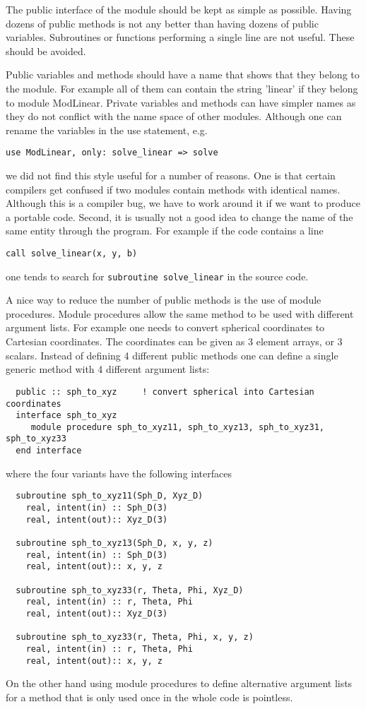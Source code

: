 \documentclass{article}
\begin{document}
The public interface of the module should be kept as simple as possible. Having
dozens of public methods is not any better than having dozens of public 
variables. Subroutines or functions performing a single line are not useful.
These should be avoided.

Public variables and methods should have a name that shows that they belong
to the module. For example all of them can contain the string 'linear' if
they belong to module ModLinear. Private variables and methods can have
simpler names as they do not conflict with the name space of other modules.
Although one can rename the variables in the use statement, e.g.
\begin{verbatim}
use ModLinear, only: solve_linear => solve
\end{verbatim}
we did not find this style useful for a number of reasons. One is that certain
compilers get confused if two modules contain methods with identical names. 
Although this is a compiler bug, we have to work around it if we want to 
produce a portable code. Second, it is usually not a good idea to change
the name of the same entity through the program. For example if the code
contains a line
\begin{verbatim}
call solve_linear(x, y, b)
\end{verbatim}
one tends to search for {\tt subroutine solve\_linear} in the source code.

A nice way to reduce the number of public methods is the use of module
procedures. Module procedures allow the same method to be used with
different argument lists. For example one needs to convert spherical 
coordinates to Cartesian coordinates. The coordinates can be given as 
3 element arrays, or 3 scalars. Instead of defining 4 different public methods
one can define a single generic method with 4 different argument lists:
\begin{verbatim}
  public :: sph_to_xyz     ! convert spherical into Cartesian coordinates
  interface sph_to_xyz
     module procedure sph_to_xyz11, sph_to_xyz13, sph_to_xyz31, sph_to_xyz33
  end interface
\end{verbatim}
where the four variants have the following interfaces
\begin{verbatim}
  subroutine sph_to_xyz11(Sph_D, Xyz_D)
    real, intent(in) :: Sph_D(3)
    real, intent(out):: Xyz_D(3)

  subroutine sph_to_xyz13(Sph_D, x, y, z)
    real, intent(in) :: Sph_D(3)
    real, intent(out):: x, y, z

  subroutine sph_to_xyz33(r, Theta, Phi, Xyz_D)
    real, intent(in) :: r, Theta, Phi
    real, intent(out):: Xyz_D(3)

  subroutine sph_to_xyz33(r, Theta, Phi, x, y, z)
    real, intent(in) :: r, Theta, Phi
    real, intent(out):: x, y, z
\end{verbatim}
On the other hand using module procedures to define alternative argument
lists for a method that is only used once in the whole code is pointless.
\end{document}
